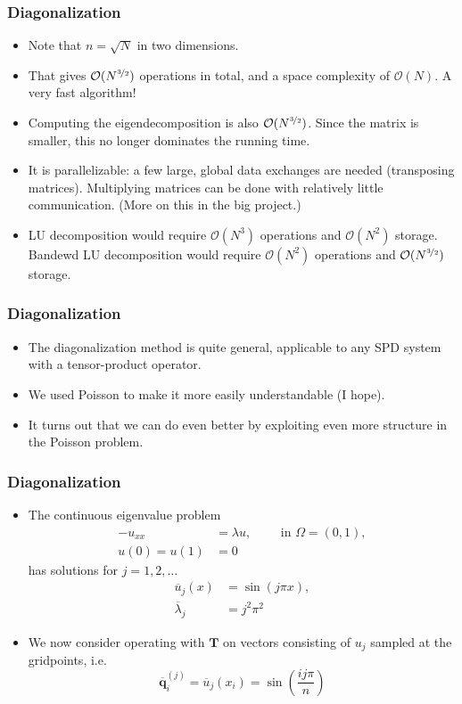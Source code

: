 \begin{frame}
  \frametitle{Diagonalization}
  \begin{itemize}
  \item Note that $n = \sqrt{N}$ in two dimensions.
  \item That gives $\mathcal{O}(N^{\nicefrac{3}{2}})$ operations in total, and a
    space complexity of $\mathcal{O}(N)$. A very fast algorithm!
  \item Computing the eigendecomposition is also
    $\mathcal{O}(N^{\nicefrac{3}{2}})$. Since the matrix is smaller, this no
    longer dominates the running time.
  \item It is parallelizable: a few large, global data exchanges are needed
    (transposing matrices). Multiplying matrices can be done with relatively
    little communication. (More on this in the big project.)
  \item LU decomposition would require $\mathcal{O}(N^3)$ operations and
    $\mathcal{O}(N^2)$ storage. Bandewd LU decomposition would require
    $\mathcal{O}(N^2)$ operations and $\mathcal{O}(N^{\nicefrac{3}{2}})$
    storage.
  \end{itemize}
\end{frame}

\begin{frame}
  \frametitle{Diagonalization}
  \begin{itemize}
  \item The diagonalization method is quite general, applicable to any SPD
    system with a tensor-product operator.
  \item We used Poisson to make it more easily understandable (I hope).
  \item It turns out that we can do even better by exploiting even more
    structure in the Poisson problem.
  \end{itemize}
\end{frame}

\begin{frame}
  \frametitle{Diagonalization}
  \begin{itemize}
  \item The continuous eigenvalue problem
    \begin{align*}
      -u_{xx} &= \lambda u, \qquad \text{ in } \Omega = (0,1), \\
      u(0) = u(1) &= 0
    \end{align*}
    has solutions for $j = 1,2,\ldots$
    \begin{align*}
      \overline u_j(x) &= \sin (j\pi x), \\
      \overline \lambda_j &= j^2 \pi^2
    \end{align*}
    \item We now consider operating with $\bm T$ on vectors consisting of $u_j$
      sampled at the gridpoints, i.e.
      \[
        \overline {\bm q}^{(j)}_i = \overline u_j(x_i) = \sin \left( \frac{ij\pi}{n} \right)
      \]
  \end{itemize}
\end{frame}

